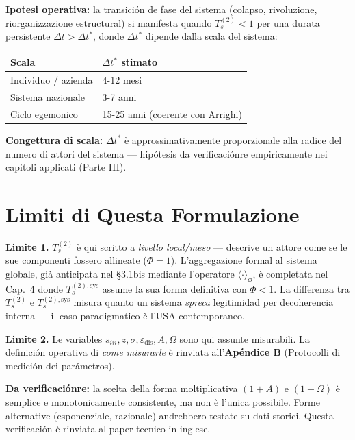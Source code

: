 \Hypoth{} \textbf{Ipotesi operativa:} la transición de fase del sistema
(colapso, rivoluzione, riorganizzazione estructural) si manifesta
quando \(T_s^{(2)} < 1\) per una durata persistente
\(\Delta t > \Delta t^*\), donde \(\Delta t^*\) dipende dalla scala del
sistema:

{\def\LTcaptype{none} %
{\small\begin{longtable}[]{@{}ll@{}}
\toprule\noalign{}
Scala & \(\Delta t^*\) stimato \\
\midrule\noalign{}
\endhead
\bottomrule\noalign{}
\endlastfoot
Individuo / azienda & 4-12 mesi \\
Sistema nazionale & 3-7 anni \\
Ciclo egemonico & 15-25 anni (coerente con Arrighi) \\
\end{longtable}}
}

\Conj{} \textbf{Congettura di scala:} \(\Delta t^*\) è
approssimativamente proporzionale alla radice del numero di attori del
sistema --- hipótesis da verificaciónre empiricamente nei capitoli applicati
(Parte III).



\section{Limiti di Questa
Formulazione}\label{limiti-di-questa-formulazione}

\Conj{} \textbf{Limite 1.} \(T_s^{(2)}\) è qui scritto a \emph{livello
local/meso} --- descrive un attore come se le sue componenti fossero
allineate (\(\Phi = 1\)). L'aggregazione formal al sistema globale, già
anticipata nel \S{}3.1bis mediante l'operatore \(\langle\cdot\rangle_\Phi\),
è completata nel Cap.~4 donde \(T_s^{(2),\text{sys}}\) assume la sua
forma definitiva con \(\Phi < 1\). La differenza tra \(T_s^{(2)}\) e
\(T_s^{(2),\text{sys}}\) misura quanto un sistema \emph{spreca}
legitimidad per decoherencia interna --- il caso paradigmatico è l'USA
contemporaneo.

\Conj{} \textbf{Limite 2.} Le variables
\(s_{iii}, z, \sigma, \varepsilon_{\text{dis}}, A, \Omega\) sono qui
assunte misurabili. La definición operativa di \emph{come misurarle} è
rinviata all'\textbf{Apéndice B} (Protocolli di medición dei
parámetros).

\ToVerify{} \textbf{Da verificaciónre:} la scelta della forma moltiplicativa
\((1+A)\) e \((1+\Omega)\) è semplice e monotonicamente consistente, ma
non è l'unica possibile. Forme alternative (esponenziale, razionale)
andrebbero testate su dati storici. Questa verificación è rinviata al paper
tecnico in inglese.



